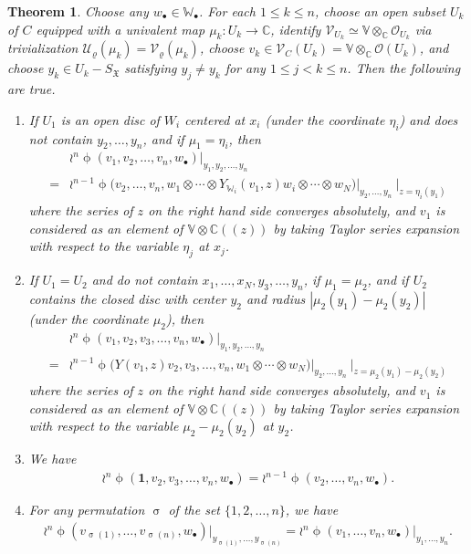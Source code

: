 \documentclass[12pt,b5paper,notitlepage]{report}
\theoremstyle{definition}
\theoremstyle{plain}
\newtheorem{thm}[df]{Theorem}
\newcommand{\fk}{\mathfrak}
\newcommand{\mc}{\mathcal}
\newcommand{\id}{\mathbf{1}}
\newcommand{\scr}{\mathscr}
\newcommand{\blt}{\bullet}
\newcommand{\Vbb}{\mathbb V}
\newcommand{\Wbb}{\mathbb W}
\newcommand{\Cbb}{\mathbb C}
\numberwithin{equation}{section}
\begin{document}
\begin{thm}\label{lb92}
Choose any $w_\blt\in\Wbb_\blt$. For each $1\leq k\leq n$, choose an open subset  $U_k$  of $C$ equipped with a univalent map $\mu_k:U_k\rightarrow\Cbb$, identify $\scr V_{U_k}\simeq \Vbb\otimes_\Cbb\scr O_{U_k}$ via trivialization $\mc U_\varrho(\mu_k)=\mc V_\varrho(\mu_k)$,  choose $v_k\in\scr V_C(U_k)=\Vbb\otimes_\Cbb\scr O(U_k)$, and choose $y_k\in U_k-S_{\fk X}$ satisfying $y_j\neq y_k$ for any $1\leq j<k\leq n$. Then the following are true.
\begin{enumerate}[label=(\arabic*)]
\item If $U_1$ is an open disc of $W_i$ centered at $x_i$ (under the coordinate $\eta_i$) and does not contain $y_2,\dots,y_n$, and if $\mu_1=\eta_i$, then
	\begin{align}
	&\wr^n\upphi(v_1,v_2,\dots,v_n,w_\blt)\big|_{y_1,y_2,\dots,y_n}\nonumber\\
	=&\wr^{n-1}\upphi\big(v_2,\dots,v_n,w_1\otimes\cdots\otimes Y_{\Wbb_i}(v_1,z)w_i\otimes\cdots\otimes w_N\big)\big|_{y_2,\dots,y_n}~\big|_{z=\eta_i(y_1)}
	\end{align}
where the series of $z$ on the right hand side converges absolutely, and $v_1$ is considered as an element of $\Vbb\otimes\Cbb((z))$ by taking Taylor series expansion with respect to the variable $\eta_j$ at $x_j$.
\item If $U_1=U_2$ and do not contain $x_1,\dots,x_N,y_3,\dots,y_n$, if $\mu_1=\mu_2$, and if $U_2$ contains the closed disc with center $y_2$ and radius $|\mu_2(y_1)-\mu_2(y_2)|$ (under the coordinate $\mu_2$), then
	\begin{align}
	&\wr^n\upphi(v_1,v_2,v_3,\dots,v_n,w_\blt)\big|_{y_1,y_2,\dots,y_n}\nonumber\\
	=&\wr^{n-1}\upphi\big(Y(v_1,z)v_2,v_3,\dots,v_n,w_1\otimes\cdots\otimes w_N\big)\big |_{y_2,\dots,y_n}~\big |_{z=\mu_2(y_1)-\mu_2(y_2)}
	\end{align}
where the series of $z$ on the right hand side converges absolutely, and $v_1$ is considered as an element of $\Vbb\otimes\Cbb((z))$ by taking Taylor series expansion with respect to the variable $\mu_2-\mu_2(y_2)$ at $y_2$.
	\item  We have
	\begin{align}
\wr^n\upphi(\id,v_2,v_3,\dots,v_n,w_\blt)=\wr^{n-1}\upphi(v_2,\dots,v_n,w_\blt).
	\end{align}
	\item For any permutation $\upsigma$ of the set $\{1,2,\dots,n\}$, we have
	\begin{align}
	\wr^n\upphi(v_{\upsigma(1)},\dots,v_{\upsigma(n)},w_\blt)\big|_{y_{\upsigma(1)},\dots,y_{\upsigma(n)}}=\wr^n\upphi(v_1,\dots,v_n,w_\blt)\big|_{y_1,\dots,y_n}.
	\end{align}
\end{enumerate}
\end{thm}
\end{document}
